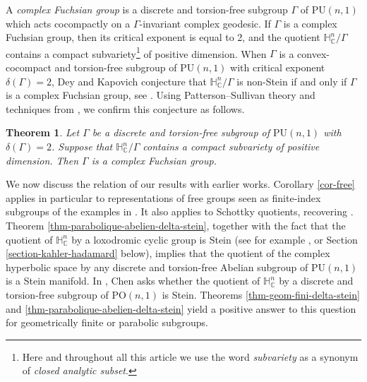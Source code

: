 \documentclass{article}
\newtheorem{theoremIntro}{Theorem}
\theoremstyle{definition}
\theoremstyle{remark}
\newcommand{\C}{\mathbb{C}}
\newcommand{\HNC}{\mathbb{H}^{n}_{\C}}
\newcommand{\PU}{\mathrm{PU}}
\newcommand{\PO}{\mathrm{PO}}
\begin{document}
	A \textit{complex Fuchsian group} is a discrete and torsion-free subgroup $\Gamma$ of $\PU(n,1)$ which acts cocompactly on a $\Gamma$-invariant complex geodesic. If $\Gamma$ is a complex Fuchsian group, then its critical exponent is equal to 2, and the quotient $\HNC/\Gamma$ contains a compact subvariety\footnote{Here and throughout all this article we use the word \textit{subvariety} as a synonym of \textit{closed analytic subset}.} of positive dimension. When $\Gamma$ is a convex-cocompact and torsion-free subgroup of $\PU(n,1)$ with critical exponent $\delta(\Gamma)=2$, Dey and Kapovich conjecture that $\HNC/\Gamma$ is non-Stein if and only if $\Gamma$ is a complex Fuchsian group, see \cite[Conjecture 17]{deyNoteComplexhyperbolicKleinian2020}. Using Patterson--Sullivan theory and techniques from \cite{connellNaturalFlowCritical2023}, we confirm this conjecture as follows.
	
	\begin{theoremIntro}\label{thm-delta2}
		Let $\Gamma$ be a discrete and torsion-free subgroup of $\PU(n,1)$ with $\delta(\Gamma)=2$. Suppose that $\HNC/\Gamma$ contains a compact subvariety of positive dimension. Then $\Gamma$ is a complex Fuchsian group.
	\end{theoremIntro}	
	
	We now discuss the relation of our results with earlier works. Corollary \ref{cor-free} applies in particular to representations of free groups seen as finite-index subgroups of the examples in \cite{goldmanComplexHyperbolicIdeal1992,falbelModuliSpaceModular2003}. It also applies to Schottky quotients, recovering \cite[Theorem 4.3]{miebachSchottkyGroupActions2018}. Theorem \ref{thm-parabolique-abelien-delta-stein}, together with the fact that the quotient of $\HNC$ by a loxodromic cyclic group is Stein (see for example \cite{defabritiisFamilyComplexManifolds1998manuel}, \cite{chenDiscreteGroupsHolomorphic2013} or Section \ref{section-kahler-hadamard} below), implies that the quotient of the complex hyperbolic space by any discrete and torsion-free Abelian subgroup of $\PU(n,1)$ is a Stein manifold. In \cite{chenDiscreteGroupsHolomorphic2013}, Chen asks whether the quotient of $\HNC$ by a discrete and torsion-free subgroup of $\PO(n,1)$ is Stein. Theorems \ref{thm-geom-fini-delta-stein} and \ref{thm-parabolique-abelien-delta-stein} yield a positive answer to this question for geometrically finite  or parabolic subgroups.
	
\end{document}
